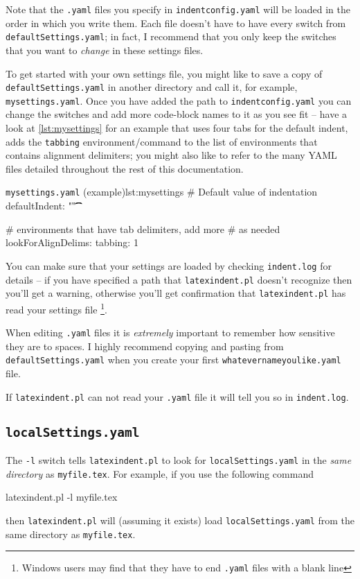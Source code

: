 	Note that the \texttt{.yaml} files you specify in \texttt{indentconfig.yaml} will be loaded in the order in which you write them.
	Each file doesn't have to have every switch from \texttt{defaultSettings.yaml}; in fact, I recommend that you only keep the switches that you want to \emph{change} in these settings files.

	To get started with your own settings file, you might like to save a copy of \texttt{defaultSettings.yaml} in another directory and call it, for example, \texttt{mysettings.yaml}.
	Once you have added the path to \texttt{indentconfig.yaml} you can change the switches and add more code-block names to it as you see fit -- have a look at \cref{lst:mysettings} for an example that uses four tabs for the default indent, adds the \texttt{tabbing} environment/command to the list of environments that contains alignment delimiters; you might also like to refer to the many YAML files detailed throughout the rest of this documentation.

	\begin{yaml}{\texttt{mysettings.yaml} (example)}{lst:mysettings}
# Default value of indentation
defaultIndent: "\t\t\t\t"

# environments that have tab delimiters, add more
# as needed
lookForAlignDelims:
    tabbing: 1
\end{yaml}

	You can make sure that your settings are loaded by checking \texttt{indent.log} for details -- if you have specified a path that \texttt{latexindent.pl} doesn't recognize then you'll get a warning, otherwise you'll get confirmation that \texttt{latexindent.pl} has read your settings file \footnote{Windows users may find that they have to end \texttt{.yaml} files with a blank line}.

	\begin{warning}
		When editing \texttt{.yaml} files it is \emph{extremely} important to remember how sensitive they are to spaces.
		I highly recommend copying and pasting from \texttt{defaultSettings.yaml} when you create your first \texttt{whatevernameyoulike.yaml} file.

		If \texttt{latexindent.pl} can not read your \texttt{.yaml} file it will tell you so in \texttt{indent.log}.
	\end{warning}

\subsection{\texttt{localSettings.yaml}}
	\label{sec:localsettings}
	The \texttt{-l} switch tells \texttt{latexindent.pl} to look for \texttt{localSettings.yaml} in the \emph{same directory} as \texttt{myfile.tex}.
	For example, if you use the following command \begin{commandshell}
latexindent.pl -l myfile.tex
\end{commandshell} then \texttt{latexindent.pl} will (assuming it exists) load \texttt{localSettings.yaml} from the same directory as \texttt{myfile.tex}.

